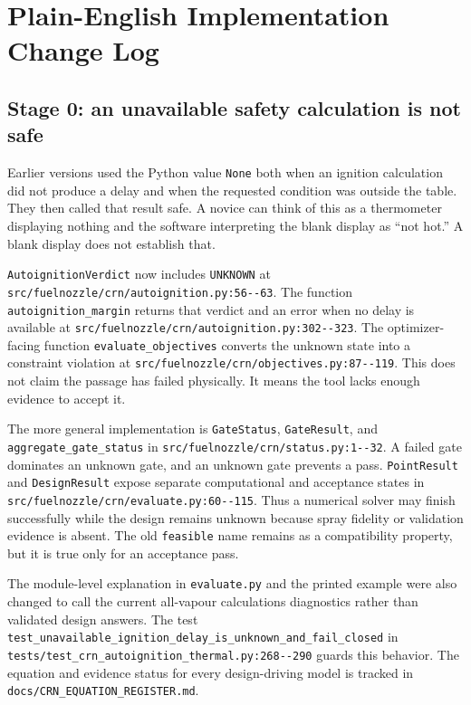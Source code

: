 \documentclass[11pt]{article}
\newcommand{\code}[1]{\nolinkurl{#1}}
\newcommand{\srcline}[2]{\nolinkurl{#1:#2}}
\begin{document}
\section{Plain-English Implementation Change Log}

\subsection{Stage 0: an unavailable safety calculation is not safe}

Earlier versions used the Python value \code{None} both when an ignition calculation did
not produce a delay and when the requested condition was outside the table. They then called
that result safe. A novice can think of this as a thermometer displaying nothing and the
software interpreting the blank display as ``not hot.'' A blank display does not establish
that.

\code{AutoignitionVerdict} now includes \code{UNKNOWN} at
\srcline{src/fuelnozzle/crn/autoignition.py}{56--63}. The function
\code{autoignition_margin} returns that verdict and an error when no delay is available at
\srcline{src/fuelnozzle/crn/autoignition.py}{302--323}. The optimizer-facing function
\code{evaluate_objectives} converts the unknown state into a constraint violation at
\srcline{src/fuelnozzle/crn/objectives.py}{87--119}. This does not claim the passage has
failed physically. It means the tool lacks enough evidence to accept it.

The more general implementation is \code{GateStatus}, \code{GateResult}, and
\code{aggregate_gate_status} in
\srcline{src/fuelnozzle/crn/status.py}{1--32}. A failed gate dominates an unknown gate, and
an unknown gate prevents a pass. \code{PointResult} and \code{DesignResult} expose separate
computational and acceptance states in
\srcline{src/fuelnozzle/crn/evaluate.py}{60--115}. Thus a numerical solver may finish
successfully while the design remains unknown because spray fidelity or validation evidence
is absent. The old \code{feasible} name remains as a compatibility property, but it is true
only for an acceptance pass.

The module-level explanation in \code{evaluate.py} and the printed example were also
changed to call the current all-vapour calculations diagnostics rather than validated
design answers. The test
\code{test_unavailable_ignition_delay_is_unknown_and_fail_closed} in
\srcline{tests/test_crn_autoignition_thermal.py}{268--290} guards this behavior. The
equation and evidence status for every design-driving model is tracked in
\code{docs/CRN_EQUATION_REGISTER.md}.
\end{document}
